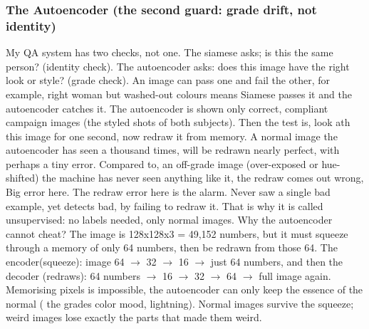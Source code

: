 \documentclass[conference]{IEEEtran}
\begin{document}
\subsubsection{The Autoencoder (the second guard: grade drift, not identity)}
My QA system has two checks, not one. The siamese asks; is this the same person? (identity check). The autoencoder asks: does this image have the right look or style? (grade check). An image can pass one and fail the other, for example, right woman but washed-out colours means Siamese passes it and the autoencoder catches it.
The autoencoder is shown only correct, compliant campaign images (the styled shots of both subjects). Then the test is, look ath this image for one second, now redraw it from memory. A normal image the autoencoder has seen a thousand times, will be redrawn nearly perfect, with perhaps a tiny error. Compared to, an
off-grade image (over-exposed or hue-shifted) the machine has never seen anything like it, the redraw comes out wrong, Big error here. The redraw error here is the alarm. Never saw a single bad example, yet detects bad, by failing to redraw it. That is why it is called unsupervised: no labels needed, only normal images.
Why the autoencoder cannot cheat?
The image is 128x128x3 = 49,152 numbers, but it must squeeze through a memory of only 64 numbers, then be redrawn from those 64. The encoder(squeeze): image  64 $\rightarrow$ 32 $\rightarrow$ 16 $\rightarrow$ just 64 numbers, and then the decoder (redraws): 64 numbers $\rightarrow$ 16 $\rightarrow$ 32 $\rightarrow$ 64 $\rightarrow$ full image again. Memorising pixels is impossible, the autoencoder can only keep the essence of the normal ( the grades color mood, lightning). Normal images survive the squeeze; weird images lose exactly the parts that made them weird.
\end{document}
